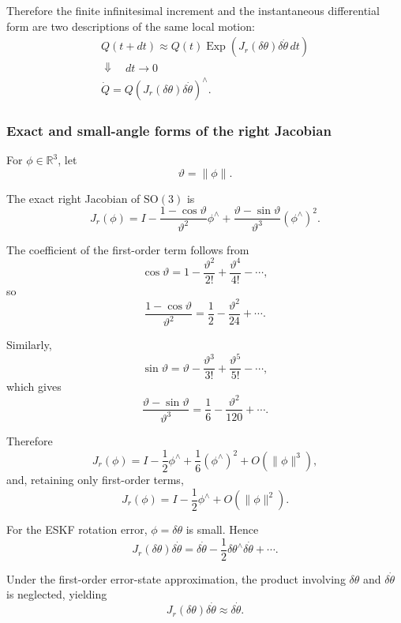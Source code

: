 \documentclass[11pt]{article}
\numberwithin{equation}{section}
\newcommand{\Exp}{\operatorname{Exp}}
\newcommand{\SO}{\mathrm{SO}}
\newcommand{\R}{\mathbb{R}}
\begin{document}
Therefore the finite infinitesimal increment and the instantaneous
differential form are two descriptions of the same local motion:
\begin{equation}
\boxed{
\begin{array}{c}
Q(t+dt)
\approx
Q(t)\Exp\!\left(
J_r(\delta\theta)\delta\dot\theta\,dt
\right)
\\[4mm]
\Downarrow\quad dt\to0
\\[4mm]
\dot Q
=
Q
\left(
J_r(\delta\theta)\delta\dot\theta
\right)^\wedge.
\end{array}
}
\end{equation}

\subsubsection*{Exact and small-angle forms of the right Jacobian}

For $\phi\in\R^3$, let
\[
\vartheta=\|\phi\|.
\]

The exact right Jacobian of $\SO(3)$ is
\begin{equation}
\boxed{
J_r(\phi)
=
I
-
\frac{1-\cos\vartheta}{\vartheta^2}\phi^\wedge
+
\frac{\vartheta-\sin\vartheta}{\vartheta^3}
(\phi^\wedge)^2.
}
\end{equation}

The coefficient of the first-order term follows from
\[
\cos\vartheta
=
1-\frac{\vartheta^2}{2!}
+\frac{\vartheta^4}{4!}
-\cdots,
\]
so
\[
\frac{1-\cos\vartheta}{\vartheta^2}
=
\frac12-\frac{\vartheta^2}{24}+\cdots.
\]

Similarly,
\[
\sin\vartheta
=
\vartheta-\frac{\vartheta^3}{3!}
+\frac{\vartheta^5}{5!}
-\cdots,
\]
which gives
\[
\frac{\vartheta-\sin\vartheta}{\vartheta^3}
=
\frac16-\frac{\vartheta^2}{120}+\cdots.
\]

Therefore
\[
J_r(\phi)
=
I
-\frac12\phi^\wedge
+\frac16(\phi^\wedge)^2
+O(\|\phi\|^3),
\]
and, retaining only first-order terms,
\begin{equation}
\boxed{
J_r(\phi)
=
I-\frac12\phi^\wedge+O(\|\phi\|^2).
}
\end{equation}

For the ESKF rotation error, $\phi=\delta\theta$ is small. Hence
\[
J_r(\delta\theta)\delta\dot\theta
=
\delta\dot\theta
-\frac12
\delta\theta^\wedge\delta\dot\theta
+\cdots.
\]

Under the first-order error-state approximation, the product involving
$\delta\theta$ and $\delta\dot\theta$ is neglected, yielding
\begin{equation}
\boxed{
J_r(\delta\theta)\delta\dot\theta
\approx
\delta\dot\theta.
}
\end{equation}
\end{document}
